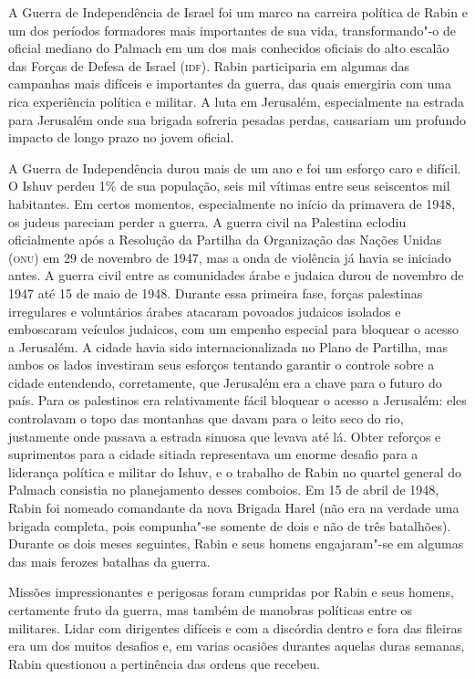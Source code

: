 A Guerra de Independência de Israel foi um marco na carreira política de
Rabin e um dos períodos formadores mais importantes de sua vida,
transformando"-o de oficial mediano do Palmach em um dos mais conhecidos
oficiais do alto escalão das Forças de Defesa de Israel (\textsc{idf}). Rabin participaria em algumas das
campanhas mais difíceis e importantes da guerra, das quais emergiria com uma
rica experiência política e militar. A luta em Jerusalém,
especialmente na estrada para Jerusalém onde sua brigada sofreria
pesadas perdas, causariam um profundo impacto de longo prazo no jovem
oficial.

A Guerra de Independência durou mais de um ano e foi um esforço caro e
difícil. O Ishuv perdeu 1\% de sua população, seis mil vítimas entre seus
seiscentos mil habitantes. Em certos momentos, especialmente no início da
primavera de 1948, os judeus pareciam perder a guerra. A
guerra civil na Palestina eclodiu oficialmente após a Resolução da
Partilha da Organização das Nações Unidas (\textsc{onu}) 
em 29 de novembro de 1947, mas a onda de violência já
havia se iniciado antes. A guerra civil entre as comunidades árabe e
judaica durou de novembro de 1947 até 15 de maio de 1948. Durante essa
primeira fase, forças palestinas irregulares e voluntários árabes
atacaram povoados judaicos isolados e emboscaram veículos judaicos, com
um empenho especial para bloquear o acesso a Jerusalém. A cidade havia
sido internacionalizada no Plano de Partilha, mas ambos os lados
investiram seus esforços tentando garantir o controle sobre a cidade
entendendo, corretamente, que Jerusalém era a chave para o futuro do
país. Para os palestinos era %
relativamente fácil bloquear o acesso a Jerusalém: eles controlavam o
topo das montanhas que davam para o leito seco do rio, justamente onde
passava a estrada sinuosa que levava até lá. Obter reforços e
suprimentos para a cidade sitiada representava um enorme desafio para a
liderança política e militar do Ishuv, e o trabalho de Rabin no quartel
general do Palmach consistia no planejamento desses comboios. Em 15 de
abril de 1948, Rabin foi nomeado comandante da nova Brigada Harel (não
era na verdade uma brigada completa, pois compunha"-se somente de dois e
não de três batalhões). Durante os dois meses seguintes, Rabin e seus
homens engajaram"-se em algumas das mais ferozes batalhas da guerra.

Missões impressionantes e perigosas foram cumpridas por Rabin e seus
homens, certamente fruto da guerra, mas também de manobras políticas
entre os militares. Lidar com dirigentes difíceis e com a discórdia dentro
e fora das fileiras era um dos muitos desafios e, em varias ocasiões
durantes aquelas duras semanas, Rabin questionou a pertinência das
ordens que recebeu.

